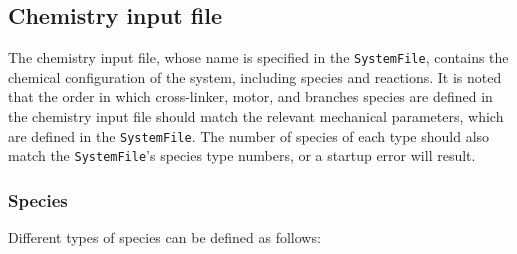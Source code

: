 \documentclass[11pt, oneside]{article}   	%
\begin{document}
\subsection{Chemistry input file}
The chemistry input file, whose name is specified in the \texttt{SystemFile}, contains the chemical configuration of the system, including species and reactions. It is noted that the order in which cross-linker, motor, and branches species are defined in the chemistry input file should match the relevant mechanical parameters, which are defined in the \texttt{SystemFile}. The number of species of each type should also match the \texttt{SystemFile}'s species type numbers, or a startup error will result.

\subsubsection{Species}
Different types of species can be defined as follows:
\end{document}
